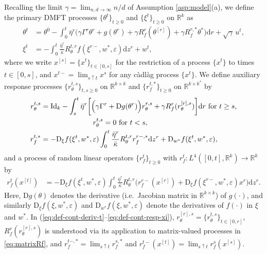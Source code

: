 \documentclass[11pt,letterpaper,reqno]{amsart}
\theoremstyle{definition}
\def\eps{\varepsilon}
\def\d{\mathrm{d}}
\def\D{\mathrm{D}}
\def\R{\mathbb{R}}
\def\Id{\mathrm{Id}}
\begin{document}
Recalling the limit
$\gamma=\lim_{n,d \to \infty} n/d$ of Assumption \ref{asp:model}(a),
we define the primary DMFT processes $\{\theta^t\}_{t \geq 0}$
and $\{\xi^t\}_{t \geq 0}$ on $\R^k$ as
\begin{align}
\theta^t&=\theta^0-\int_0^t \bar\eta^r \Big({\gamma}\Gamma^r
\theta^r+g(\theta^r)+{\gamma}R_f^r(\theta^{[r]})+
{\gamma}R_f^{r,*}\theta^*\Big)\d r+\sqrt{\gamma}\,u^t,
\label{eq:def-cont-theta}\\
\xi^t&={-}\int_0^t \frac{\bar\eta^r}{\bar\kappa} R_\theta^{t,r}
f(\xi^{r-},w^*,\eps)\d z^r+w^t,\label{eq:def-cont-xi}
\end{align}
where we write $x^{[s]}=\{x^t\}_{t \in [0,s]}$ for the restriction of a process
$\{x^t\}$ to times $t \in [0,s]$, and
$x^{t-}=\lim_{s \uparrow t} x^s$ for any c\`adl\`ag process $\{x^t\}$.
We define auxiliary response
processes $\{r_\theta^{t,s}\}_{t,s \geq 0}$ on $\R^{k \times k}$
and $\{r_f^{t,*}\}_{t \geq 0}$ on $\R^{k \times k^*}$ by
\begin{align}
r_\theta^{t,s}&=\Id_k-
\int_s^t \bar\eta^r\bigg[\Big({\gamma}\Gamma^r+\D
g(\theta^r)\Big)r_\theta^{r,s}+{\gamma}
R_f^r(r_\theta^{[r],s})\bigg]\d r \text{ for } t \geq s,
\label{eq:def-cont-deriv-t}\\
&\hspace{1in}r_\theta^{t,s}=0 \text{ for } t<s,\notag\\
r_f^{t,*}&={-}\D_\xi f(\xi^t,w^*,\eps) \int_0^t
\frac{\bar\eta^r}{\bar\kappa}
R_\theta^{t,r}r_f^{r-,*}\d z^r
+\D_{w^*} f(\xi^t,w^*,\eps),\label{eq:def-cont-deriv-xi-star}
\end{align}
and a process of random linear operators $\{r_f^t\}_{t \geq 0}$
with $r_f^t:L^4([0,t],\R^k) \to \R^k$ by
\begin{align}
r_f^t(x^{[t]})&={-}\D_\xi
f(\xi^t,w^*,\eps) \int_0^t \frac{\bar\eta^r}{\bar\kappa}
R_\theta^{t,r}\bigg(r_f^{r-}(x^{[r]})+\D_\xi
f(\xi^{r-},w^*,\eps)x^r\bigg)\d z^r.\label{eq:def-cont-resp-xi}
\end{align}
Here, $\D g(\theta)$ denotes the derivative (i.e.\ Jacobian matrix in $\R^{k
\times k}$) of $g(\cdot)$, and similarly
$\D_\xi f(\xi,w^*,\eps)$ and $\D_{w^*} f(\xi,w^*,\eps)$
denote the derivatives of $f(\cdot)$ in $\xi$ and $w^*$. In
(\ref{eq:def-cont-deriv-t}--\ref{eq:def-cont-resp-xi}),
$r_\theta^{[r],s}=\{r_\theta^{t,s}\}_{t \in [0,r]}$,
$R_f^r(r_\theta^{[r],s})$ is understood via its application to matrix-valued
processes in \eqref{eq:matrixRf}, and $r_f^{t-,*}=\lim_{s \uparrow t} r_f^{s,*}$
and $r_f^{t-}(x^{[t]})=\lim_{s \uparrow t} r_f^s(x^{[s]})$.
\end{document}
